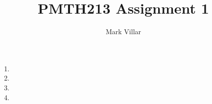 \documentclass[12pt]{amsart}
\title{PMTH213 \hfill Assignment 1}
\author{Mark Villar}
\begin{document}
 

\maketitle 

\begin{enumerate}
	
	\item
			
	\item 
		
	\item 

	\item

\end{enumerate}
\end{document}
